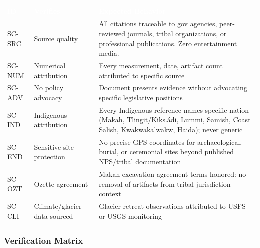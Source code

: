 \documentclass[11pt,letterpaper]{article}
\newcommand{\tableheader}[1]{\textbf{\sffamily\textcolor{white}{#1}}}
\begin{document}
\begin{center}
\begin{tabularx}{\textwidth}{C{1.5cm}L{3.5cm}X}
\toprule
{}
\tableheader{ID} & \tableheader{Verifies} & \tableheader{Expected Behavior} \\
\midrule
SC-SRC & Source quality & All citations traceable to gov agencies, peer-reviewed journals, tribal organizations, or professional publications. Zero entertainment media. \\
SC-NUM & Numerical attribution & Every measurement, date, artifact count attributed to specific source \\
SC-ADV & No policy advocacy & Document presents evidence without advocating specific legislative positions \\
SC-IND & Indigenous attribution & Every Indigenous reference names specific nation (Makah, Tlingit/Kiks.ádi, Lummi, Samish, Coast Salish, Kwakwaka'wakw, Haida); never generic \\
SC-END & Sensitive site protection & No precise GPS coordinates for archaeological, burial, or ceremonial sites beyond published NPS/tribal documentation \\
SC-OZT & Ozette agreement & Makah excavation agreement terms honored: no removal of artifacts from tribal jurisdiction context \\
SC-CLI & Climate/glacier data sourced & Glacier retreat observations attributed to USFS or USGS monitoring \\
\bottomrule
\end{tabularx}
\end{center}

\subsubsection{Verification Matrix}
\end{document}

